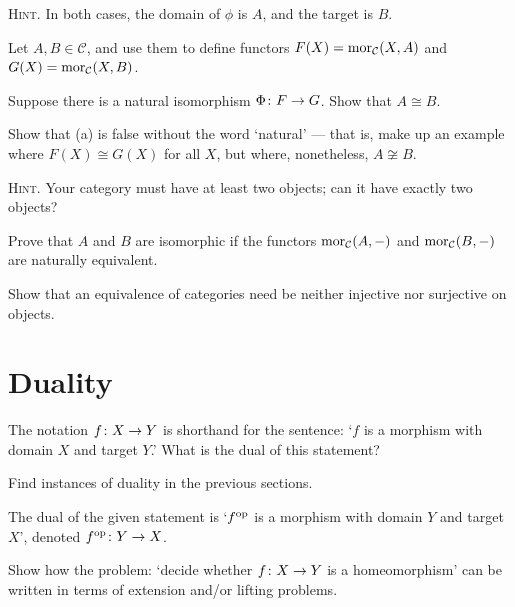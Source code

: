 {\scshape Hint}. In both cases, the domain of $\phi$ is $A$, and the target is $B$.
\ep

\bs
\ben[label=(\alph*)]
\item
\item
\een
\es

\bp
Let $A,B \in \mathcal{C}$, and use them to define functors $F(X) = \operatorname{mor}_{\mathcal{C}}(X,A)$ and $G(X) = \operatorname{mor}_{\mathcal{C}}(X,B)$.
\ben[label=(\alph*)]
\item Suppose there is a natural isomorphism $\Phi \colon F \to G$. Show that $A\cong B$.
\item Show that (a) is false without the word `natural' --- that is, make up an example where $F(X)\cong G(X)$ for all $X$, but where, nonetheless, $A\not\cong B$.

{\scshape Hint}. Your category must have at least two objects; can it have exactly two objects?
\item Prove that $A$ and $B$ are isomorphic if the functors $\operatorname{mor}_{\mathcal{C}}(A,-)$ and $\operatorname{mor}_{\mathcal{C}}(B,-)$ are naturally equivalent.
\een
\ep

\bs
\ben[label=(\alph*)]
\item
\item
\item
\een
\es

\bx
Show that an equivalence of categories need be neither injective nor surjective on objects.
\ex

\bs
\es

\section{Duality}

\bx
\ben[label=(\alph*)]
\item The notation $f \colon X \to Y$ is shorthand for the sentence: `$f$ is a morphism with domain $X$ and target $Y$.' What is the dual of this statement?
\item Find instances of duality in the previous sections.
\een
\ex

\bs
\ben[label=(\alph*)]
\item The dual of the given statement is `$f^{\mathrm{op}}$ is a morphism with domain $Y$ and target $X$', denoted $f^{\mathrm{op}}\colon Y\to X$.
\item
\een
\es

\begin{extrae}
Show how the problem: `decide whether $f \colon X \to Y$ is a homeomorphism' can be written in terms of extension and/or lifting problems.
\end{extrae}

